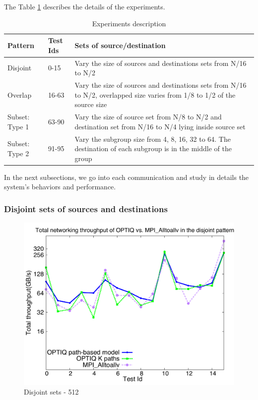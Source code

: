 The Table \ref{tbl:experiment} describes the details of the experiments.

\begin{table}[h]
\begin{center}
    \begin{tabular}{ | p{1cm} | l | p{5cm} |}
    \hline
    Pattern & Test Ids & Sets of source/destination \\ \hline
    Disjoint & 0-15 & Vary the size of sources and destinations sets from N/16 to N/2 \\ \hline
    Overlap & 16-63 & Vary the size of sources and destinations sets from N/16 to N/2, overlapped size varies from 1/8 to 1/2 of the source size \\ \hline
    Subset: Type 1 & 63-90 & Vary the size of source set from N/8 to N/2 and destination set from N/16 to N/4 lying inside source set \\ \hline
    Subset: Type 2 & 91-95 & Vary the subgroup size from 4, 8, 16, 32 to 64. The destination of each subgroup is in the middle of the group \\
    \hline
    \end{tabular}

    \caption{Experiments description}
    \label{tbl:experiment}

\end{center}
\end{table}

In the next subsections, we go into each communication and study in details the system's behaviors and performance.

\subsubsection{Disjoint sets of sources and destinations}

\begin{figure}[!htb]
\vspace{-0.1in}
\centering
\includegraphics[scale=0.30]{figures/disjoint_512.pdf}
\vspace{-0.1in}
\caption{Disjoint sets - 512}
\vspace{-0.1in}
\label{fig:disjoint_512}
\end{figure}

